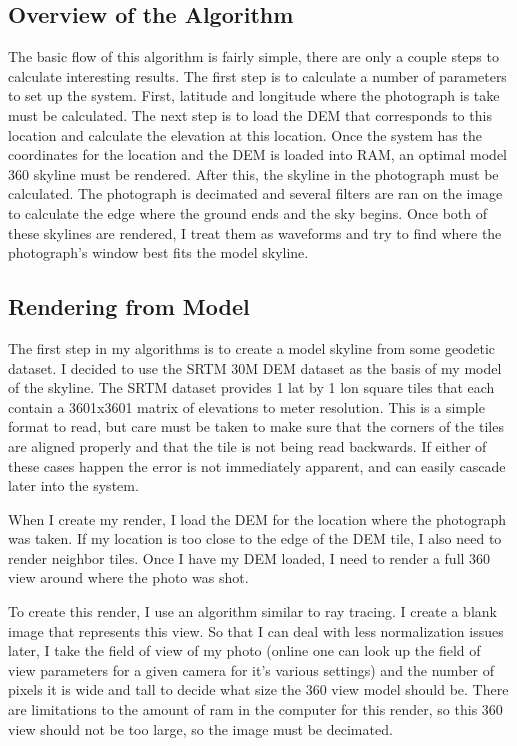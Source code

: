 \documentclass{acm_proc_article-sp}
\begin{document}
\subsection{Overview of the Algorithm}
	The basic flow of this algorithm is fairly simple, there are only a couple steps to calculate interesting results.  The first step is to calculate a number of parameters to set up the system.  First, latitude and longitude where the photograph is take must be calculated.  The next step is to load the DEM that corresponds to this location and calculate the elevation at this location.  Once the system has the coordinates for the location and the DEM is loaded into RAM, an optimal model 360 skyline must be rendered. 
	After this, the skyline in the photograph must be calculated.  The photograph is decimated and several filters are ran on the image to calculate the edge where the ground ends and the sky begins. Once both of these skylines are rendered, I treat them as waveforms \cite{Schafer:DSP} and try to find where the photograph's window best fits the model skyline. 
\subsection{Rendering from Model}
The first step in my algorithms is to create a model skyline from some geodetic dataset.  I decided to use the  SRTM 30M DEM dataset as the basis of my model of the skyline.  The SRTM dataset provides 1 lat by 1 lon square tiles that each contain a 3601x3601 matrix of elevations to meter resolution. \cite{farr2007shuttle} This is a simple format to read, but care must be taken to make sure that the corners of the tiles are aligned properly and that the tile is not being read backwards. If either of these cases happen the error is not immediately apparent, and can easily cascade later into the system.  

When I create my render, I load the DEM for the location where the photograph was taken.   If my location is too close to the edge of the DEM tile, I also need to render  neighbor tiles.  Once I have my DEM loaded, I need to render a full 360 view around where the photo was shot.  

To create this render, I use an algorithm similar to ray tracing.  I create a blank image that represents this view.  So that I can deal with less normalization issues later, I take the field of view of my photo (online one can look up the field of view parameters for a given camera for it’s various settings) and the number of pixels it is wide and tall to decide what size the 360 view model should be.  There are limitations to the amount of ram in the computer for this render, so this 360 view should not be too large, so the image must be decimated.
\end{document}
